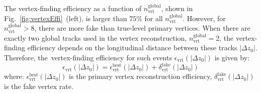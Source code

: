 The vertex-finding efficiency as a function of $n^\textrm{global}_\textrm{vrt}$, shown in  Fig.~\ref{fig:vertexEffi}~(left), is larger than $75\%$ for all $n^\textrm{global}_\textrm{vrt}$. However, for $n^\textrm{global}_\textrm{vrt}>8$, there are more fake  than true-level primary vertices. When there are exactly two global tracks used in the vertex reconstruction, $n^\textrm{global}_\textrm{vrt}=2$, the vertex-finding efficiency depends on the longitudinal distance between these tracks $|\Delta z_0|$. Therefore, the~vertex-finding efficiency for such events $\epsilon_\textrm{vrt}\left(|\Delta z_0|\right)$ is given by:
\begin{equation}
\epsilon_\textrm{vrt}\left(|\Delta z_0|\right)=\epsilon_\textrm{vrt}^\textrm{best}\left(|\Delta z_0|\right)+\delta_\textrm{vrt}^\textrm{fake}\left(|\Delta z_0|\right)
\end{equation}
where: $\epsilon_\textrm{vrt}^\textrm{best}\left(|\Delta z_0|\right)$ is the primary vertex reconstruction efficiency, $\delta_\textrm{vrt}^\textrm{fake}\left(|\Delta z_0|\right)$ is the fake vertex rate.

